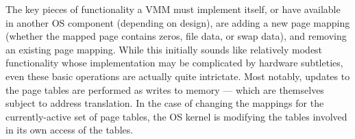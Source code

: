 The key pieces of functionality a VMM must implement itself, or have available in another OS component (depending on 
design), are
adding a new page mapping (whether the mapped page contains zeros, file data, or swap data), and removing an existing 
page mapping.
While this initially sounds like relatively modest functionality whose implementation may be complicated by hardware 
subtleties, even these basic operations are actually quite intrictate.
Most notably, updates to the page tables are performed as writes to memory --- which are themselves subject to address translation.
In the case of changing the mappings for the currently-active set of page tables, the OS kernel is modifying the tables involved in its
own access of the tables.


